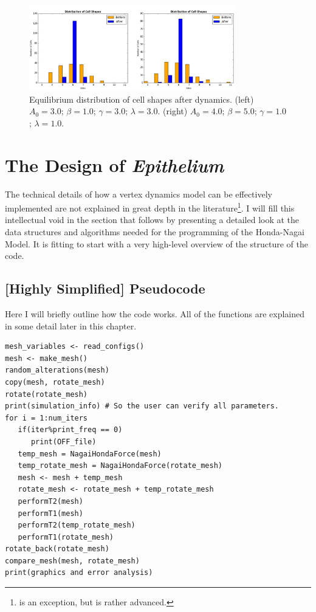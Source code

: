\begin{figure}
\centering
\includegraphics[width=0.8\textwidth]{../diagrams/shapeComp.png}
\caption[Equilibrium distribution of cell shapes.]{Equilibrium distribution of cell shapes after dynamics. (left) $A_0 = 3.0$; $\beta = 1.0$; $\gamma = 3.0$; $\lambda = 3.0$. (right) $A_0 = 4.0$; $\beta = 5.0$; $\gamma = 1.0$; $\lambda = 1.0$.}
\label{fig:g2}
\end{figure}

\section{The Design of \emph{Epithelium}}
The technical details of how a vertex dynamics model can be effectively implemented are not explained in great depth in the literature\footnote{\cite{ChasteMain} is an exception, but is rather advanced.}. I will fill this intellectual void in the section that follows by presenting a detailed look at the data structures and algorithms needed for the programming of the Honda-Nagai Model. It is fitting to start with a very high-level overview of the structure of the code.

\subsection{[Highly Simplified] Pseudocode}
Here I will briefly outline how the code works. All of the functions are explained in some detail later in this chapter.
\begin{lstlisting}
mesh_variables <- read_configs()
mesh <- make_mesh()
random_alterations(mesh)
copy(mesh, rotate_mesh)
rotate(rotate_mesh)
print(simulation_info) # So the user can verify all parameters.
for i = 1:num_iters
   if(iter%print_freq == 0)
      print(OFF_file)
   temp_mesh = NagaiHondaForce(mesh) 
   temp_rotate_mesh = NagaiHondaForce(rotate_mesh)
   mesh <- mesh + temp_mesh
   rotate_mesh <- rotate_mesh + temp_rotate_mesh
   performT2(mesh)
   performT1(mesh)
   performT2(temp_rotate_mesh)
   performT1(rotate_mesh)
rotate_back(rotate_mesh)
compare_mesh(mesh, rotate_mesh)
print(graphics and error analysis)
\end{lstlisting}

